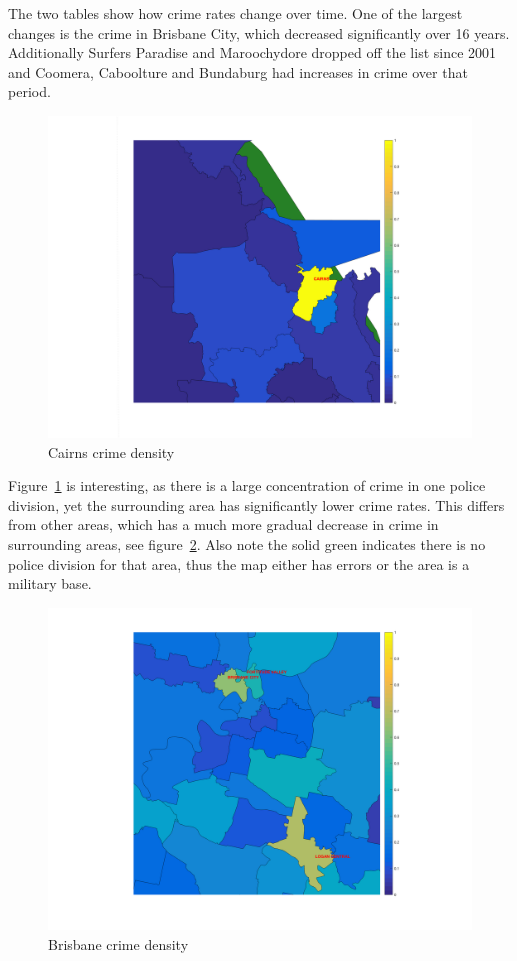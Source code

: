 \documentclass[]{article}
\begin{document}
The two tables show how crime rates change over time.
One of the largest changes is the crime in Brisbane City, which decreased significantly over 16 years.
Additionally Surfers Paradise and Maroochydore dropped off the list since 2001 and Coomera, Caboolture and Bundaburg had increases in crime over that period.

\begin{figure}[H]
    \caption{Cairns crime density}
    \centering
    \label{fig:cairns_crime}
    \includegraphics[width=\linewidth]{../images/cairns_crime}
\end{figure}

Figure~\ref{fig:cairns_crime} is interesting, as there is a large concentration of crime in one police division,
yet the surrounding area has significantly lower crime rates.
This differs from other areas, which has a much more gradual decrease in crime in surrounding areas, see figure~\ref{fig:brisbane_crime}.
Also note the solid green indicates there is no police division for that area, thus the map either has errors
or the area is a military base.

\begin{figure}[H]
    \caption{Brisbane crime density}
    \centering
    \label{fig:brisbane_crime}
    \includegraphics[width=\linewidth]{../images/brisbane_crime}
\end{figure}
\end{document}
